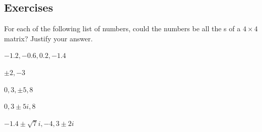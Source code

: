 \begin{draft}

\end{draft}%








\subsection{Exercises}





\begin{exercise} \label{ex:} 
For each of the following list of numbers, could the numbers be all the s of a \(4\times4\) matrix? 
Justify your answer.
\begin{parts}
\item \(-1.2,-0.6,0.2,-1.4\)

\item \(\pm2,-3\)

\item \(0,3,\pm5,8\)

\item \(0,3\pm5i,8\)

\item \(-1.4\pm\sqrt7i,-4,3\pm2i\)

\end{parts}
\end{exercise}





